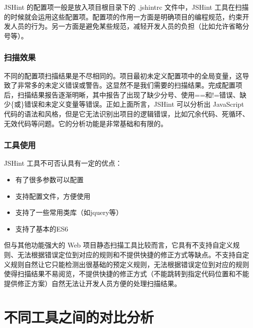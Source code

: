 \documentclass[hyperref, a4paper]{ctexart}
\providecommand{\tightlist}{%
  \setlength{\itemsep}{0pt}\setlength{\parskip}{0pt}}
\begin{document}
JSHint 的配置项一般是放入项目根目录下的 .jshintrc 文件中，JSHint
工具在扫描的时候就会运用这些配置项。配置项的作用一方面是明确项目的编程规范，约束开发人员的行为。另一方面是避免某些规范，减轻开发人员的负担（比如允许省略分号等）。

\hypertarget{ux626bux63cfux6548ux679c-1}{%
\subsubsection{扫描效果}\label{ux626bux63cfux6548ux679c-1}}

不同的配置项扫描结果是不尽相同的。项目最初未定义配置项中的全局变量，这导致了非常多的未定义错误或警告。这显然不是我们需要的扫描结果。完成配置项后，扫描结果报告逐渐明晰，其中报告了出现了缺少分号、使用==和!=错误、缺少\{或\}错误和未定义变量等错误。正如上面所言，JSHint
可以分析出 JavaScript
代码的语法和风格，但是它无法识别出项目的逻辑错误，比如冗余代码、死循环、无效代码等问题。它的分析功能是非常基础和有限的。

\hypertarget{ux5de5ux5177ux4f7fux7528}{%
\subsubsection{工具使用}\label{ux5de5ux5177ux4f7fux7528}}

JSHint 工具不可否认具有一定的优点：

\begin{itemize}
\tightlist
\item
  有了很多参数可以配置
\item
  支持配置文件，方便使用
\item
  支持了一些常用类库（如jquery等）
\item
  支持了基本的ES6
\end{itemize}

但与其他功能强大的 Web
项目静态扫描工具比较而言，它具有不支持自定义规则、无法根据错误定位到对应的规则和不提供快捷的修正方式等缺点。不支持自定义规则自然让它只能检测出很基础的预定义规则，无法根据错误定位到对应的规则使得扫描结果不易阅览，不提供快捷的修正方式（不能跳转到指定代码位置和不能提供修正方案）自然无法让开发人员方便的处理扫描结果。

\hypertarget{ux4e0dux540cux5de5ux5177ux4e4bux95f4ux7684ux5bf9ux6bd4ux5206ux6790}{%
\section{不同工具之间的对比分析}\label{ux4e0dux540cux5de5ux5177ux4e4bux95f4ux7684ux5bf9ux6bd4ux5206ux6790}}
\end{document}
